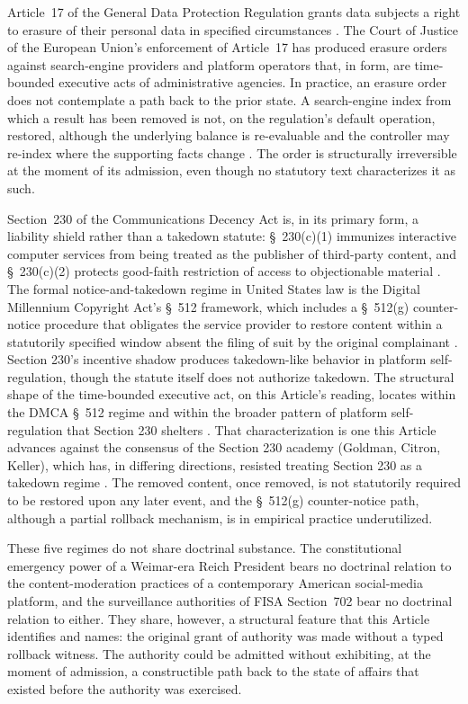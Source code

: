 Article~17 of the General Data Protection Regulation grants data subjects a right to erasure of their personal data
in specified circumstances \cite{ref_gdpr_art17}.
The Court of Justice of the European Union's enforcement of Article~17 has produced erasure orders against
search-engine providers and platform operators that, in form, are time-bounded executive acts of administrative agencies.
In practice, an erasure order does not contemplate a path back to the prior state.
A search-engine index from which a result has been removed is not, on the regulation's default operation, restored,
although the underlying balance is re-evaluable and the controller may re-index where the supporting facts change
\cite{ref_kuner_gdpr_erasure}.
The order is structurally irreversible at the moment of its admission,
even though no statutory text characterizes it as such.

Section~230 of the Communications Decency Act is, in its primary form, a liability shield rather than a takedown
statute: \S~230(c)(1) immunizes interactive computer services from being treated as the publisher of third-party content,
and \S~230(c)(2) protects good-faith restriction of access to objectionable material
\cite{ref_section230_shield}.
The formal notice-and-takedown regime in United States law is the Digital Millennium Copyright Act's \S~512 framework,
which includes a \S~512(g) counter-notice procedure that obligates the service provider to restore content
within a statutorily specified window absent the filing of suit by the original complainant
\cite{ref_dmca_512,ref_dmca_512g_counter_notice}.
Section 230's incentive shadow produces takedown-like behavior in platform self-regulation,
though the statute itself does not authorize takedown.
The structural shape of the time-bounded executive act,
on this Article's reading, locates within the DMCA \S~512 regime and within the broader pattern of platform self-regulation
that Section 230 shelters \cite{ref_keller_takedowns}.
That characterization is one this Article advances against the consensus of the Section 230 academy
(Goldman, Citron, Keller),
which has, in differing directions, resisted treating Section 230 as a takedown regime
\cite{ref_goldman_section230_2019,ref_keller_overremoval_2015}.
The removed content, once removed, is not statutorily required to be restored upon any later event,
and the \S~512(g) counter-notice path, although a partial rollback mechanism, is in empirical practice underutilized.

These five regimes do not share doctrinal substance.
The constitutional emergency power of a Weimar-era Reich President bears no doctrinal relation to the
content-moderation practices of a contemporary American social-media platform,
and the surveillance authorities of FISA Section~702 bear no doctrinal relation to either.
They share, however, a structural feature that this Article identifies and names:
the original grant of authority was made without a typed rollback witness.
The authority could be admitted without exhibiting, at the moment of admission,
a constructible path back to the state of affairs that existed before the authority was exercised.

